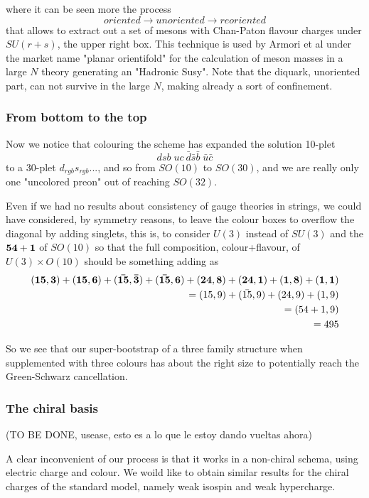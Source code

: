 \documentclass[a4paper]{article}
\begin{document}
where it can be seen more the process 
$$ oriented \to unoriented \to reoriented $$
that allows to extract out a set of mesons with Chan-Paton flavour charges
under $SU(r+s)$, the upper right box. 
This technique is used by Armori et al under the market 
name "planar orientifold" for the calculation of meson masses in a large $N$
theory generating an "Hadronic Susy". Note that the diquark, 
unoriented part, can not survive in the large $N$, making already a sort of confinement.

\subsubsection*{From bottom to the top}

Now we notice that colouring the scheme has expanded the solution 10-plet 
$$ dsb \; uc \  \bar d\bar s\bar b \; \bar u\bar c $$ to
a 30-plet $d_{rgb}s_{rgb}...$, and so from $SO(10)$ to $SO(30)$,
and we are really only one "uncolored preon" out of reaching $SO(32)$.

Even if we had no results about consistency of gauge theories in
strings, we could have considered, by symmetry reasons, to leave
the colour boxes to overflow the diagonal by adding singlets, this is, 
to consider $U(3)$ instead of $SU(3)$ and the $\bf 54+1$ of $SO(10)$ so that the
full composition, colour+flavour, of $U(3) \times O(10)$ should be something
adding as
\begin{eqnarray*}
\bf 
(15,3)+(15,6)+(\bar {15},\bar 3)+(\bar {15},6)+(24,8)+(24,1)+(1,8)+(1,1) \\
=(15,9)+(\bar {15}, 9)+(24,9)+(1,9)  
\\ =(54+1,9) \\ =495
\end{eqnarray*}

So we see that our super-bootstrap of a three family structure
when supplemented with three colours has about the right size
to potentially reach the Green-Schwarz cancellation.


\subsubsection*{The chiral basis}(TO BE DONE, usease, esto es a lo
que le estoy dando vueltas ahora)


A clear inconvenient of our process is that it works in a non-chiral schema,
using electric charge and colour. We woild like to obtain similar results
for the chiral charges of the standard model, namely weak isospin
and weak hypercharge.
\end{document}
